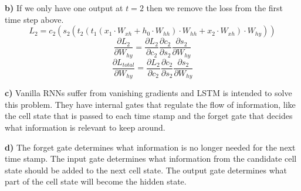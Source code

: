 \documentclass[12pt]{article}
\begin{document}
\textbf{b)} If we only have one output at $t = 2$ then we remove the loss from the first time step above.
$$L_2 = c_2(s_2(t_2(t_1(x_1 \cdot W_{xh} + h_0 \cdot W_{hh}) \cdot W_{hh} + x_2 \cdot W_{xh}) \cdot W_{hy}))$$
$$\frac{\partial L_2}{\partial W_{hy}} = \frac{\partial L_2}{\partial c_2}\frac{\partial c_2}{\partial s_2}\frac{\partial s_2}{\partial W_{hy}}$$
$$\frac{\partial L_{total}}{\partial W_{hy}} = \frac{\partial L_2}{\partial c_2}\frac{\partial c_2}{\partial s_2}\frac{\partial s_2}{\partial W_{hy}}$$

\textbf{c)} Vanilla RNNs suffer from vanishing gradients and LSTM is intended to solve this problem.
They have internal gates that regulate the flow of information, like the cell state that is passed to each time stamp and the forget gate that decides what information is relevant to keep around.

\textbf{d)} The forget gate determines what information is no longer needed for the next time stamp.
The input gate determines what information from the candidate cell state should be added to the next cell state.
The output gate determines what part of the cell state will become the hidden state.


\end{document}
